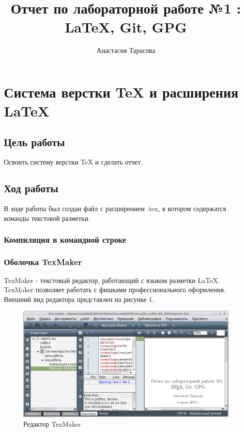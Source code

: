 \documentclass[12pt,a4paper]{article}
\author{Анастасия Тарасова}
\title{Отчет по лабораторной работе №1 :\\ \LaTeX{}, Git, GPG}
\begin{document}
\maketitle
\section{Система верстки \TeX{} и расширения \LaTeX{}}
\subsection{Цель работы}
Освоить систему верстки \TeX{} и сделать отчет.
\subsection{Ход работы}
В ходе работы был создан файл с расширением .tex, в котором содержатся команды текстовой разметки.
\subsubsection{Компиляция в командной строке}
\subsubsection{Оболочка TexMaker}
TexMaker - текстовый редактор, работающий с языком разметки LaTeX. TexMaker позволяет работать с фишками профессионального оформления. Внешний вид редактора представлен на рисунке 1.
\begin{figure}[h!]
\centering
\includegraphics[scale=0.4]{res/texmaker}
\caption{Редактор TexMaker}
\end{figure}
\end{document}
